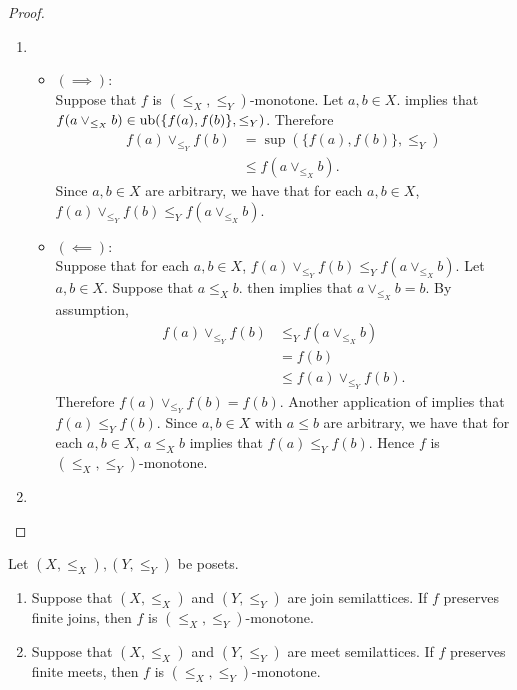 \documentclass{book}
\begin{document}
	\begin{proof}\
		\begin{enumerate}
			\item 
			\begin{itemize}
				\item $(\implies)$: \\
				Suppose that $f$ is $(\leq_X, \leq_Y)$-monotone. Let $a,b \in X$.  implies that $f(a \vee_{\leq_X} b) \in \operatorname{ub}(\{f(a), f(b)\}, \leq_Y)$. Therefore
				\begin{align*}
					f(a) \vee_{\leq_Y} f(b)
					& = \sup (\{f(a), f(b)\}, \leq_Y) \\
					& \leq f(a \vee_{\leq_X} b).
				\end{align*}
				Since $a,b \in X$ are arbitrary, we have that for each $a,b \in X$, $f(a) \vee_{\leq_Y} f(b) \leq_Y f(a \vee_{\leq_X} b)$.
				\item $(\impliedby)$: \\
				Suppose that for each $a,b \in X$, $f(a) \vee_{\leq_Y} f(b) \leq_Y f(a \vee_{\leq_X} b)$. Let $a,b \in X$. Suppose that $a \leq_X b$.  then implies that $a \vee_{\leq_X} b = b$. By assumption, 
				\begin{align*}
					f(a) \vee_{\leq_Y} f(b) 
					& \leq_Y f(a \vee_{\leq_X} b) \\
					& = f(b) \\
					& \leq f(a) \vee_{\leq_Y} f(b).
				\end{align*}
				Therefore $f(a) \vee_{\leq_Y} f(b) = f(b)$. Another application of  implies that $f(a) \leq_Y f(b)$. Since $a,b \in X$ with $a \leq b$ are arbitrary, we have that for each $a,b \in X$, $a \leq_X b$ implies that $f(a) \leq_Y f(b)$. Hence $f$ is $(\leq_X, \leq_Y)$-monotone.
			\end{itemize}
			\item {}
		\end{enumerate}
	\end{proof}
	
	\begin{ex}
		Let $(X, \leq_X), (Y, \leq_Y)$ be posets. 
		\begin{enumerate}
			\item Suppose that $(X, \leq_X)$ and $(Y, \leq_Y)$ are join semilattices. If $f$ preserves finite joins, then $f$ is $(\leq_X, \leq_Y)$-monotone.
			\item Suppose that $(X, \leq_X)$ and $(Y, \leq_Y)$ are meet semilattices. If $f$ preserves finite meets, then $f$ is $(\leq_X, \leq_Y)$-monotone.
		\end{enumerate}
	\end{ex}
	
\end{document}
